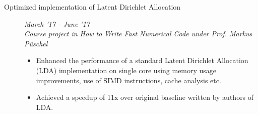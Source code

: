 \documentclass[9pt]{article}
\newenvironment{changemargin}[2]{%
  \begin{list}{}{%
      \setlength{\topsep}{0pt}%
    \setlength{\leftmargin}{#1}%
    \setlength{\rightmargin}{#2}%
    \setlength{\listparindent}{\parindent}%
  \setlength{\itemindent}{\parindent}%
    \setlength{\parsep}{\parskip}%
    }%
  \item[]}{\end{list}
    }
\newenvironment{body} {
  \vspace*{-16pt}
        \begin{changemargin}{-0.6in}{-0.65in}
        }	
        {\end{changemargin}
}
\begin{document}
\begin{body}
\begin{description}
    \item[\normalsize{Optimized implementation of Latent Dirichlet Allocation}]  \hfill \textit{March '17 - June '17} \\
      \textit{Course project in How to Write Fast Numerical Code under Prof. Markus P{\"u}schel}
      \begin{itemize}
        \item Enhanced the performance of a standard Latent Dirichlet Allocation (LDA)
          implementation on single core using memory usage improvements, use of 
          SIMD instructions, cache analysis etc.
        \item Achieved a speedup of 11x over original baseline written by authors
          of LDA.
      \end{itemize}




\end{description}
\end{body}
\end{document}
